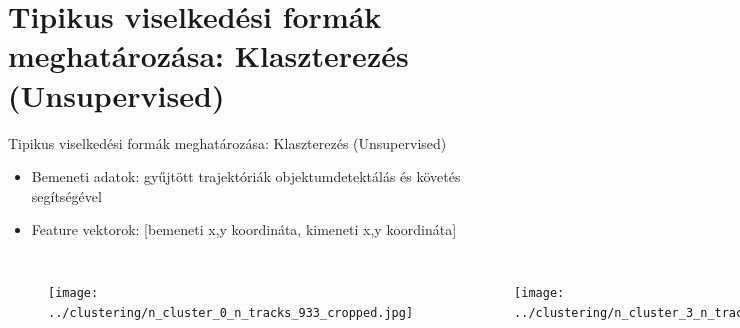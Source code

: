 \documentclass{beamer}
\begin{document}
\section{Tipikus viselkedési formák meghatározása: Klaszterezés (Unsupervised)}
\begin{frame}{Tipikus viselkedési formák meghatározása: Klaszterezés (Unsupervised)}
    \begin{itemize}
        \item Bemeneti adatok: gyűjtött trajektóriák objektumdetektálás és követés segítségével
        \item Feature vektorok: [bemeneti x,y koordináta, kimeneti x,y koordináta]
    \end{itemize}
    \begin{columns}
        \begin{figure}
            \texttt{[image: ../clustering/n\_cluster\_0\_n\_tracks\_933\_cropped.jpg]}
        \end{figure}
        \begin{figure}
            \texttt{[image: ../clustering/n\_cluster\_3\_n\_tracks\_892\_cropped.jpg]}
        \end{figure}
        \begin{figure}
            \texttt{[image: ../clustering/n\_cluster\_5\_n\_tracks\_130\_cropped.jpg]}
        \end{figure}
    \end{columns}
\end{frame}
\end{document}
